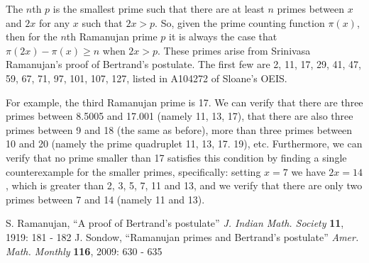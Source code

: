 \documentclass[12pt]{article}
\begin{document}
The $n$th {\em {} } $p$ is the smallest prime such that there are at least $n$ primes between $x$ and $2x$ for any $x$ such that $2x > p$. So, given the prime counting function $\pi(x)$, then for the $n$th Ramanujan prime $p$ it is always the case that $\pi(2x) - \pi(x) \ge n$ when $2x > p$. These primes arise from Srinivasa Ramanujan's proof of Bertrand's postulate. The first few are 2, 11, 17, 29, 41, 47, 59, 67, 71, 97, 101, 107, 127, listed in A104272 of Sloane's OEIS.

For example, the third Ramanujan prime is 17. We can verify that there are three primes between 8.5005 and 17.001 (namely 11, 13, 17), that there are also three primes between 9 and 18 (the same as before), more than three primes between 10 and 20 (namely the prime quadruplet 11, 13, 17. 19), etc. Furthermore, we can verify that no prime smaller than 17 satisfies this condition by finding a single counterexample for the smaller primes, specifically: setting $x = 7$ we have $2x = 14$, which is greater than 2, 3, 5, 7, 11 and 13, and we verify that there are only two primes between 7 and 14 (namely 11 and 13).

\begin{thebibliography}{2}
\bibitem S. Ramanujan, ``A proof of Bertrand's postulate'' {\it J. Indian Math. Society} {\bf 11}, 1919: 181 - 182
\bibitem J. Sondow, ``Ramanujan primes and Bertrand's postulate'' {\it Amer. Math. Monthly} {\bf 116}, 2009: 630 - 635 %
\end{thebibliography}
\end{document}
